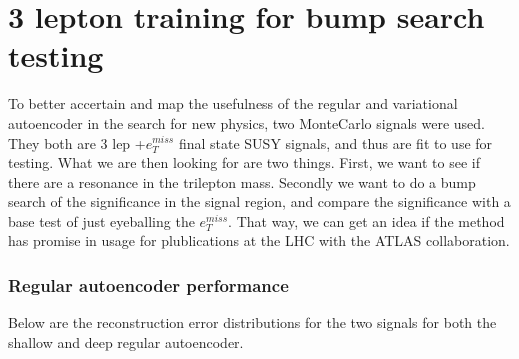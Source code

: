 
\section{3 lepton training for bump search testing}


To better accertain and map the usefulness of the regular and variational autoencoder in the search for 
new physics, two MonteCarlo signals were used. They both are 3 lep +$e_T^{miss}$ final state SUSY signals,
and thus are fit to use for testing. What we are then looking for are two things. First, we want to see if
there are a resonance in the trilepton mass. Secondly we want to do a bump search of the significance 
in the signal region, and compare the significance with a base test of just eyeballing the $e_T^{miss}$. 
That way, we can get an idea if the method has promise in usage for plublications at the LHC with the ATLAS collaboration. 

\subsubsection*{Regular autoencoder performance}

Below are the reconstruction error distributions for the two signals for both the shallow and deep 
regular autoencoder.


